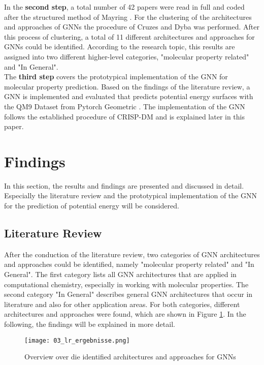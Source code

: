 In the \textbf{second step}, a total number of 42 papers were read in full and coded after the structured method of Mayring \cite{mayring2010qualitative}. For the clustering of the architectures and approaches of GNNs the procedure of Cruzes and Dyba \cite{cruzes2011recommended} was performed. After this process of clustering, a total of 11 different architectures and approaches for GNNs could be identified. According to the research topic, this results are assigned into two different higher-level categories, "molecular property related" and "In General". \\

The \textbf{third step} covers the prototypical implementation of the GNN for molecular property prediction. Based on the findings of the literature review, a GNN is implemented and evaluated that predicts potential energy surfaces with the QM9 Dataset from Pytorch Geometric \cite{noauthor_torch_geometricdatasetsqm9_nodate}. The implementation of the GNN follows the established procedure of CRISP-DM \cite{wirth2000crisp} and is explained later in this paper. 

\section{Findings}
In this section, the results and findings are presented and discussed in detail. Especially the literature review and the prototypical implementation of the GNN for the prediction of potential energy will be considered. 


\subsection{Literature Review}

After the conduction of the literature review, two categories of GNN architectures and approaches could be identified, namely "molecular property related" and "In General". The first category lists all GNN architectures that are applied in computational chemistry, especially in working with molecular properties. The second category "In General"  describes general GNN architectures that occur in literature and also for other application areas. For both categories, different architectures and approaches were found, which are shown in Figure \ref{img:paper01findings}. In the following, the findings will be explained in more detail.

\begin{figure}[h]
    \centering
    \texttt{[image: 03\_lr\_ergebnisse.png]}
    \caption[Overview over die identified architectures and approaches for GNNs]{\label{img:paper01findings}{Overview over die identified architectures and approaches for GNNs}}
\end{figure} 

